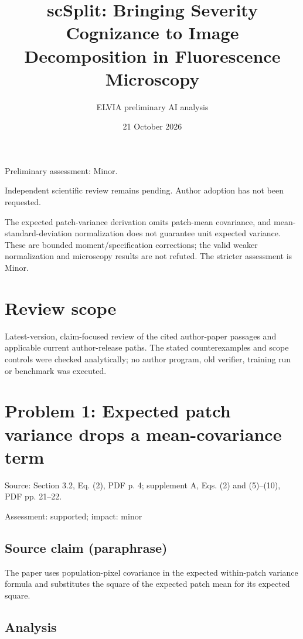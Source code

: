 \documentclass[11pt]{article}
\begin{document}
\title{scSplit: Bringing Severity Cognizance to Image Decomposition in Fluorescence Microscopy}

\author{ELVIA preliminary AI analysis}\date{21 October 2026}\maketitle

Preliminary assessment: Minor.\par

Independent scientific review remains pending. Author adoption has not been requested.

The expected patch-variance derivation omits patch-mean covariance, and mean-standard-deviation normalization does not guarantee unit expected variance. These are bounded moment/specification corrections; the valid weaker normalization and microscopy results are not refuted. The stricter assessment is Minor.

\section*{Review scope}

Latest-version, claim-focused review of the cited author-paper passages and applicable current author-release paths. The stated counterexamples and scope controls were checked analytically; no author program, old verifier, training run or benchmark was executed.

\section*{Problem 1: Expected patch variance drops a mean-covariance term}

Source: Section 3.2, Eq. (2), PDF p. 4; supplement A, Eqs. (2) and (5)–(10), PDF pp. 21–22.

Assessment: supported; impact: minor

\subsection*{Source claim (paraphrase)}

The paper uses population-pixel covariance in the expected within-patch variance formula and substitutes the square of the expected patch mean for its expected square.

\subsection*{Analysis}
\end{document}

